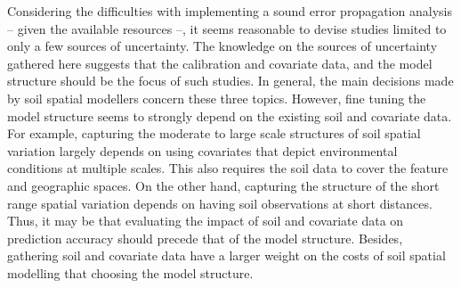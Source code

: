 Considering the difficulties with implementing a sound error propagation analysis -- given the available 
resources --, it seems reasonable to devise studies limited to only a few sources of uncertainty. The 
knowledge on the sources of uncertainty gathered here suggests that the calibration and covariate data, and 
the model structure should be the focus of such studies. In general, the main decisions made by soil spatial 
modellers concern these three topics. However, fine tuning the model structure seems to strongly depend on 
the existing soil and covariate data. For example, capturing the moderate to large scale structures of soil 
spatial variation largely depends on using covariates that depict environmental conditions at multiple scales.
This also requires the soil data to cover the feature and geographic spaces. On the other hand, capturing the 
structure of the short range spatial variation depends on having soil observations at short distances. Thus, 
it may be that evaluating the impact of soil and covariate data on prediction accuracy should precede that of 
the model structure. Besides, gathering soil and covariate data have a larger weight on the costs of soil 
spatial modelling that choosing the model structure.

